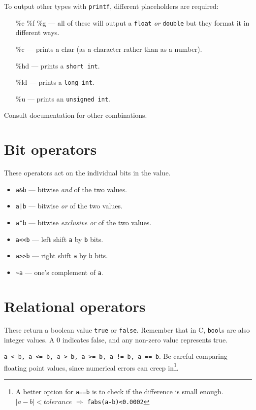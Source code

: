 To output other types with \texttt{printf}, different placeholders are required:
\begin{itemize}
 \item [\%e \%f \%g] --- all of these will output a \texttt{float} \emph{or} \texttt{double} but they format it in different ways.
 \item [\%c] --- prints a char (as a character rather than as a number).
 \item [\%hd] --- prints a \texttt{short int}.
 \item [\%ld] --- prints a \texttt{long int}.
 \item [\%u]  --- prints an \texttt{unsigned int}.
\end{itemize}
Consult documentation for other combinations.

\section{Bit operators}

These operators act on the individual bits in the value.

\begin{itemize}
 \item \lstinline|a&b| --- bitwise \emph{and} of the two values.
 \item \lstinline:a|b: --- bitwise \emph{or} of the two values.
 \item \lstinline|a^b| --- bitwise \emph{exclusive or} of the two values.
 \item \lstinline|a<<b| --- left shift \texttt{a} by \texttt{b} bits.
 \item \lstinline|a>>b| --- right shift \texttt{a} by \texttt{b} bits.
 \item \lstinline|~a| --- one's complement of \texttt{a}.
\end{itemize}

\section{Relational operators}

These return a boolean value \texttt{true} or \texttt{false}.
Remember that in C, \texttt{bool}s are also integer values.
A 0 indicates false, and any non-zero value represents true.

\lstinline|a < b, a <= b, a > b, a >= b, a != b, a == b|.
Be careful comparing floating point values, since numerical errors can 
creep in\footnote{A better option for \texttt{a==b} is to check if the difference is small 
enough. $|a-b|<tolerance$ $\Rightarrow$ \lstinline!fabs(a-b)<0.0002!}.

